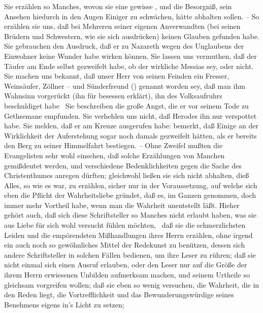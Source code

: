 \begin{aufza}
\begin{aufzb}
\item Sie erzählen so Manches, wovon sie eine gewisse , und die Besorgniß, sein Ansehen hiedurch in den Augen Einiger zu schwächen, hätte abhalten sollen. -- So erzählen sie uns, daß  bei Mehreren seiner eigenen Anverwandten (bei seinen Brüdern und Schwestern, wie sie sich ausdrücken) keinen Glauben gefunden habe. Sie gebrauchen den Ausdruck, daß er zu Nazareth wegen des Unglaubens der Einwohner keine Wunder habe wirken können. Sie lassen uns vermuthen, daß  der Täufer am Ende selbst gezweifelt habe, ob  der wirkliche Messias sey, oder nicht. Sie machen uns bekannt, daß unser Herr von seinen Feinden ein Fresser, Weinsäufer, Zöllner -- und Sünderfreund () genannt worden sey, daß man ihm Wahnsinn vorgerückt (ihn für besessen erklärt), ihn des Volksaufruhrs beschuldiget habe \usw\ Sie beschreiben die große Angst, die er vor seinem Tode zu Gethsemane empfunden. Sie verhehlen uns nicht, daß Herodes ihn nur verspottet habe. Sie melden, daß er am Kreuze ausgerufen habe:   bemerkt, daß Einige an der Wirklichkeit der Auferstehung  sogar noch damals gezweifelt hätten, als er bereits den Berg zu seiner Himmelfahrt bestiegen. -- Ohne Zweifel mußten die Evangelisten sehr wohl einsehen, daß solche Erzählungen von Manchen gemißdeutet werden, und verschiedene Bedenklichkeiten gegen die Sache des Christenthumes anregen dürften; gleichwohl ließen sie sich nicht abhalten, dieß Alles, so wie es war, zu erzählen, sicher nur in der Voraussetzung, auf welche sich eben die Pflicht der Wahrheitsliebe gründet, daß es, im Ganzen genommen, doch immer mehr Vortheil habe, wenn man die Wahrheit unentstellt läßt. Hieher gehört auch, daß sich diese Schriftsteller so Manches nicht erlaubt haben, was sie aus Liebe für  sich wohl versucht fühlen möchten, \zB\ daß sie die schmerzlichsten Leiden und die empörendsten Mißhandlungen ihres Herrn erzählen, ohne irgend ein auch noch so gewöhnliches Mittel der Redekunst zu benützen, dessen sich andere Schriftsteller in solchen Fällen bedienen, um ihre Leser zu rühren; daß sie nicht einmal sich einen Ausruf erlauben, oder den Leser nur auf die Größe der ihrem Herrn erwiesenen Unbilden aufmerksam machen, und seinem Urtheile so gleichsam vorgreifen wollen; daß sie eben so wenig versuchen, die Wahrheit, die in den Reden  liegt, die Vortrefflichkeit und das Bewunderungswürdige seines Benehmens eigens in's Licht zu setzen; \usw\

\end{aufzb}
\end{aufza}
